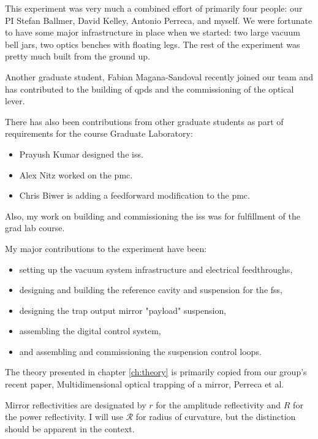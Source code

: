 \documentclass[12pt,notitlepage]{report}
\begin{document}
This experiment was very much a combined effort of primarily four people:
our PI Stefan Ballmer, David Kelley, Antonio Perreca, and myself.
We were fortunate to have some major infrastructure in place when we started:
two large vacuum bell jars, two optics benches with floating legs.
The rest of the experiment was pretty much built from the ground up.

Another graduate student, Fabian Magana-Sandoval recently joined our team
and has contributed to the building of \ac{qpd}s and the commissioning of the
optical lever.

There has also been contributions from other graduate students as part of
requirements for the course Graduate Laboratory:
\begin{itemize}
\item Prayush Kumar designed the \ac{iss}.
\item Alex Nitz worked on the \ac{pmc}.
\item Chris Biwer is adding a feedforward modification to the \ac{pmc}.
\end{itemize}
Also, my work on building and commissioning the \ac{iss} was for fulfillment of the
grad lab course.

My major contributions to the experiment have been:
\begin{itemize}
\item setting up the vacuum system infrastructure and electrical feedthroughs,
\item designing and building the reference cavity and suspension for the
  \ac{fss},
\item designing the trap output mirror "payload" suspension,
\item assembling the digital control system,
\item and assembling and commissioning the suspension control loops.
\end{itemize}

The theory presented in chapter \ref{ch:theory} is primarily copied from our
group's recent paper, Multidimensional optical trapping of a mirror,
Perreca et al. \cite{Perreca:2014}

%
%
%


Mirror reflectivities are designated by $r$ for the amplitude reflectivity
and $R$ for the power reflectivity.
I will use $\mathcal{R}$ for radius of curvature,
but the distinction should be apparent in the context.
\end{document}
